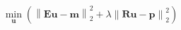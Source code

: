 \documentclass[leqno]{article}
\begin{document}
\[
\min_{\mathbf{u}} \left( \left\| \mathbf{E}\mathbf{u}-\mathbf{m} \right\|_2^2 + \lambda \left\| \mathbf{R} \mathbf{u} -\mathbf{p} \right\|_2^2 \right)
\]
\end{document}
